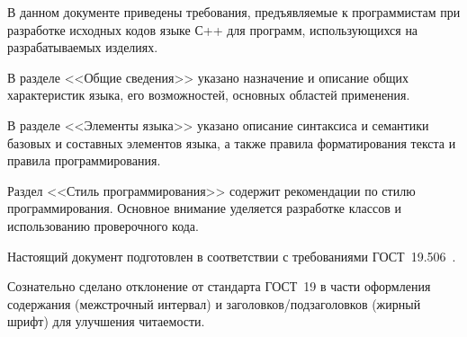 \newpage\annotation

В данном документе приведены требования, предъявляемые к программистам при разработке исходных кодов языке С++ для программ, использующихся на разрабатываемых изделиях.

В разделе <<Общие сведения>> указано назначение и описание общих характеристик языка, его возможностей, основных областей применения.

В разделе <<Элементы языка>> указано описание синтаксиса и семантики базовых и составных элементов языка, а также правила форматирования текста и правила программирования.

Раздел <<Стиль программирования>> содержит рекомендации по стилю программирования. Основное внимание уделяется разработке классов и использованию проверочного кода.

Настоящий документ подготовлен в соответствии с требованиями ГОСТ~19.506~\cite{gost_19_506_Описание_языка}.

Сознательно сделано отклонение от стандарта ГОСТ~19 в части оформления содержания (межстрочный интервал) и заголовков/подзаголовков (жирный шрифт) для улучшения читаемости.
